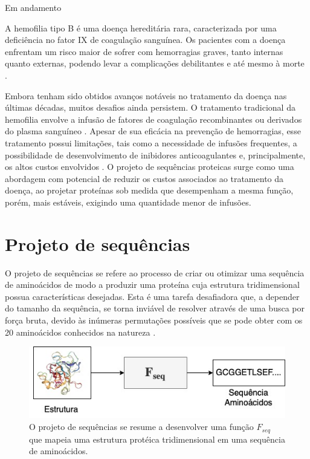 
{\color{red} Em andamento}


\label{cap:introducao}
\enlargethispage{.5\baselineskip}
A hemofilia tipo B é uma doença hereditária rara, 
caracterizada por uma deficiência no fator IX de coagulação sanguínea. 
Os pacientes com a doença enfrentam um risco maior de sofrer com hemorragias graves, 
tanto internas quanto externas, 
podendo levar a complicações debilitantes e até mesmo à morte \cite{Mannucci}.


Embora tenham sido obtidos avanços notáveis no tratamento da doença nas últimas décadas,
muitos desafios ainda persistem. 
O tratamento tradicional da hemofilia envolve a infusão de fatores de coagulação recombinantes 
ou derivados do plasma sanguíneo \cite{Gouw}. 
Apesar de sua eficácia na prevenção de hemorragias, 
esse tratamento possui limitações, 
tais como a necessidade de infusões frequentes, 
a possibilidade de desenvolvimento de inibidores anticoagulantes e, principalmente, 
os altos custos envolvidos \cite{Mancuso}. 
O projeto de sequências proteicas surge como uma abordagem com potencial de reduzir  
os custos associados ao tratamento da doença, 
ao projetar proteínas sob medida que desempenham a mesma função, porém, mais estáveis, 
exigindo uma quantidade menor de infusões. 


\section{Projeto de sequências}

O projeto de sequências se refere ao processo 
de criar ou otimizar uma sequência de aminoácidos de modo a produzir uma proteína 
cuja estrutura tridimensional possua características desejadas. 
Esta é uma tarefa desafiadora que, a depender do tamanho da sequência, 
se torna inviável de resolver através de uma busca por força bruta, 
devido às inúmeras permutações possíveis que se pode obter com os 20 aminoácidos 
conhecidos na natureza \cite{Overview}.  

\begin{figure}[H]
  \centering
  \includegraphics[width=.8\textwidth]{figuras/metodologia-SeqDes.jpg}
  \caption{O projeto de sequências se resume a desenvolver uma 
           função $F_{seq}$ que mapeia uma estrutura protéica tridimensional em uma sequência de aminoácidos. }
\end{figure}


